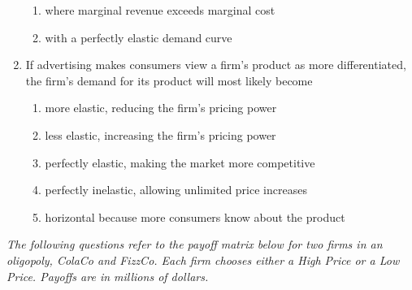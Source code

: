 \documentclass[10pt]{article}
\newenvironment{choiceslist}
  {\begin{enumerate}[label=(\Alph*), leftmargin=1.6em, itemsep=0.12em, topsep=0.18em, parsep=0pt]}
  {\end{enumerate}}
\newenvironment{stimulus}
  {\begin{center}\begin{minipage}{0.96\columnwidth}\footnotesize\itshape\setlength{\tabcolsep}{3pt}\renewcommand{\arraystretch}{0.96}}
  {\end{minipage}\end{center}}
\begin{document}
\begin{multicols*}{2}
\begin{enumerate}[resume*=apq, leftmargin=*, itemsep=0.85em, topsep=0.2em, parsep=0pt]
\begin{choiceslist}
\item where marginal revenue exceeds marginal cost
\item with a perfectly elastic demand curve
\end{choiceslist}
\item If advertising makes consumers view a firm's product as more differentiated, the firm's demand for its product will most likely become
\begin{choiceslist}
\item more elastic, reducing the firm's pricing power
\item less elastic, increasing the firm's pricing power
\item perfectly elastic, making the market more competitive
\item perfectly inelastic, allowing unlimited price increases
\item horizontal because more consumers know about the product
\end{choiceslist}
\end{enumerate}
\begin{stimulus}
The following questions refer to the payoff matrix below for two firms in an oligopoly, ColaCo and FizzCo. Each firm chooses either a High Price or a Low Price. Payoffs are in millions of dollars.


\end{stimulus}
\end{multicols*}
\end{document}
